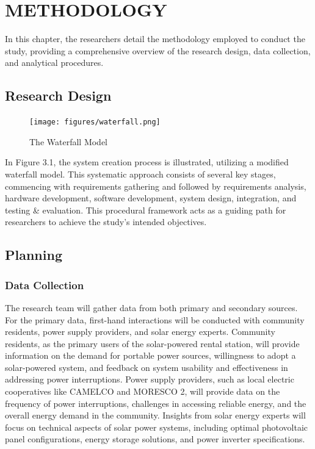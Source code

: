 
\chapter{METHODOLOGY}
{\baselineskip

In this chapter, the researchers detail the methodology employed to conduct the study, providing a comprehensive overview of the research design, data collection, and analytical procedures.

\section{Research Design}

\begin{figure}[H]
	\centering
	\caption{The Waterfall Model}
	\label{fig:waterfall}
	\texttt{[image: figures/waterfall.png]}
\end{figure}

In Figure 3.1, the system creation process is illustrated, utilizing a modified waterfall model. This systematic approach consists of several key stages, commencing with requirements gathering and followed by requirements analysis, hardware development, software development, system design, integration, and testing \& evaluation. This procedural framework acts as a guiding path for researchers to achieve the study's intended objectives.

\section{Planning}
\subsection{Data Collection}

The research team will gather data from both primary and secondary sources. For the primary data, first-hand interactions will be conducted with community residents, power supply providers, and solar energy experts. Community residents, as the primary users of the solar-powered rental station, will provide information on the demand for portable power sources, willingness to adopt a solar-powered system, and feedback on system usability and effectiveness in addressing power interruptions. Power supply providers, such as local electric cooperatives like CAMELCO and MORESCO 2, will provide data on the frequency of power interruptions, challenges in accessing reliable energy, and the overall energy demand in the community. Insights from solar energy experts will focus on technical aspects of solar power systems, including optimal photovoltaic panel configurations, energy storage solutions, and power inverter specifications.

}
